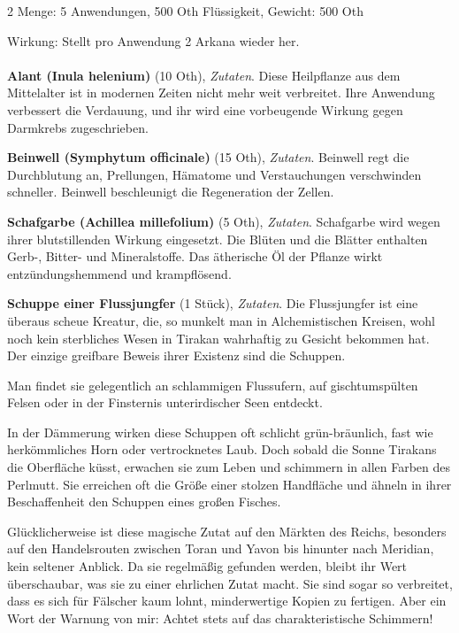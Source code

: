 \begin{multicols}{2}
Menge:
5 Anwendungen, 500 Oth Flüssigkeit, Gewicht: 500 Oth

Wirkung: Stellt pro Anwendung 2 Arkana wieder her.

    \paragraph{}
    \begin{denseitemize}
        \item \textbf{Alant (Inula helenium)} (10 Oth), \textit{Zutaten}.
        Diese Heilpflanze aus dem Mittelalter ist in modernen Zeiten nicht mehr weit verbreitet. Ihre Anwendung verbessert die Verdauung, und ihr wird eine vorbeugende Wirkung gegen Darmkrebs zugeschrieben.
        \item \textbf{Beinwell (Symphytum officinale)} (15 Oth), \textit{Zutaten}.
        Beinwell regt die Durchblutung an, Prellungen, Hämatome und Verstauchungen verschwinden schneller. Beinwell beschleunigt die Regeneration der Zellen.
        \item \textbf{Schafgarbe (Achillea millefolium)} (5 Oth), \textit{Zutaten}.
        Schafgarbe wird wegen ihrer blutstillenden Wirkung eingesetzt. Die Blüten und die Blätter enthalten Gerb-, Bitter- und Mineralstoffe. Das ätherische Öl der Pflanze wirkt entzündungshemmend und krampflösend.
        \item \textbf{Schuppe einer Flussjungfer} (1 Stück), \textit{Zutaten}.
        Die Flussjungfer ist eine überaus scheue Kreatur, die, so munkelt man in Alchemistischen Kreisen, wohl noch kein sterbliches Wesen in Tirakan wahrhaftig zu Gesicht bekommen hat. Der einzige greifbare Beweis ihrer Existenz sind die Schuppen.

Man findet sie gelegentlich an schlammigen Flussufern, auf gischtumspülten Felsen oder in der Finsternis unterirdischer Seen entdeckt.

In der Dämmerung wirken diese Schuppen oft schlicht grün-bräunlich, fast wie herkömmliches Horn oder vertrocknetes Laub. Doch sobald die Sonne Tirakans die Oberfläche küsst, erwachen sie zum Leben und schimmern in allen Farben des Perlmutt. Sie erreichen oft die Größe einer stolzen Handfläche und ähneln in ihrer Beschaffenheit den Schuppen eines großen Fisches.

Glücklicherweise ist diese magische Zutat auf den Märkten des Reichs, besonders auf den Handelsrouten zwischen Toran und Yavon bis hinunter nach Meridian, kein seltener Anblick. Da sie regelmäßig gefunden werden, bleibt ihr Wert überschaubar, was sie zu einer ehrlichen Zutat macht. Sie sind sogar so verbreitet, dass es sich für Fälscher kaum lohnt, minderwertige Kopien zu fertigen. Aber ein Wort der Warnung von mir: Achtet stets auf das charakteristische Schimmern! 


\end{denseitemize}
\end{multicols}
